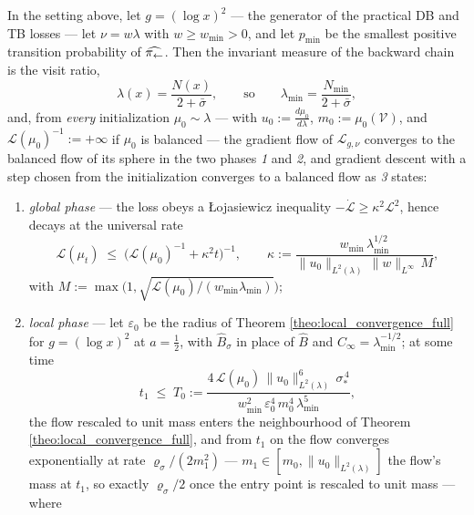 \begin{theorem}\label{theo:training_speed_full}
In the setting above, let $g=(\log x)^2$ --- the generator of the practical DB and TB losses --- let $\nu=w\lambda$ with $w\geq w_{\min}>0$, and let $p_{\min}$ be the smallest positive transition probability of $\widehat{\pi_{\leftarrow}}$. Then the invariant measure of the backward chain is the visit ratio,
\begin{equation}
    \lambda(x)=\frac{N(x)}{2+\bar\sigma},\qquad\text{so}\qquad \lambda_{\min}=\frac{N_{\min}}{2+\bar\sigma},
\end{equation}
and, from \emph{every} initialization $\mu_0\sim\lambda$ --- with $u_0:=\frac{d\mu_0}{d\lambda}$, $m_0:=\mu_0(\mathcal V)$, and $\mathcal L(\mu_0)^{-1}:=+\infty$ if $\mu_0$ is balanced --- the gradient flow of $\mathcal L_{g,\nu}$ converges to the balanced flow of its sphere in the two phases \emph{1} and \emph{2}, and gradient descent with a step chosen from the initialization converges to a balanced flow as \emph{3} states:
\begin{enumerate}
    \item \emph{global phase} --- the loss obeys a \L ojasiewicz inequality $-\dot{\mathcal L}\geq\kappa^2\mathcal L^2$, hence decays at the universal rate
    \begin{equation}\label{eq:global_phase}
        \mathcal L(\mu_t)\;\leq\;\bigl(\mathcal L(\mu_0)^{-1}+\kappa^2t\bigr)^{-1},
        \qquad
        \kappa:=\frac{w_{\min}\,\lambda_{\min}^{1/2}}{\|u_0\|_{L^2(\lambda)}\,\|w\|_{L^\infty}\,M},
    \end{equation}
    with $M:=\max\bigl(1,\sqrt{\mathcal L(\mu_0)/(w_{\min}\lambda_{\min})}\bigr)$;
    \item \emph{local phase} --- let $\varepsilon_0$ be the radius of Theorem \ref{theo:local_convergence_full} for $g=(\log x)^2$ at $a=\frac12$, with $\widehat B_\sigma$ in place of $\widehat B$ and $C_\infty=\lambda_{\min}^{-1/2}$; at some time
    \begin{equation*}
        t_1\;\leq\;T_0:=\frac{4\,\mathcal L(\mu_0)\,\|u_0\|_{L^2(\lambda)}^6\,\sigma_*^{\,4}}{w_{\min}^2\,\varepsilon_0^4\,m_0^4\,\lambda_{\min}^{5}},
    \end{equation*}
    the flow rescaled to unit mass enters the neighbourhood of Theorem \ref{theo:local_convergence_full}, and from $t_1$ on the flow converges exponentially at rate $\varrho_\sigma/(2m_1^2)$ --- $m_1\in[m_0,\|u_0\|_{L^2(\lambda)}]$ the flow's mass at $t_1$, so exactly $\varrho_\sigma/2$ once the entry point is rescaled to unit mass --- where

\end{enumerate}
\end{theorem}
